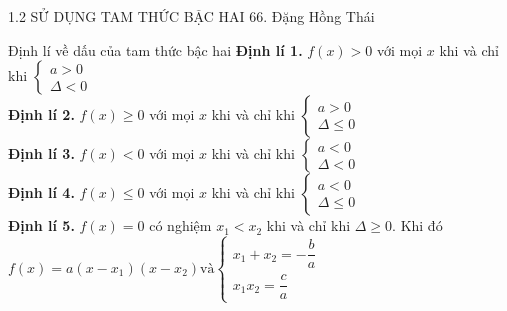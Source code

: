\begin{frame}{1.2 SỬ DỤNG TAM THỨC BẬC HAI \hspace{3cm}  66. Đặng Hồng Thái} 
    \begin{block}{Định lí về dấu của tam thức bậc hai}
        \textbf{Định lí 1.}  $f(x)>0$ với mọi $x$ khi và chỉ khi 
                $\begin{cases}
		 	a>0 \\
		 	\Delta <0
		 	\end{cases}$    \\
         \textbf{Định lí 2.}  $f(x)\geq0$ với mọi $x$ khi và chỉ khi 
                $\begin{cases}
		 	a>0 \\
		 	\Delta \leq0
		 	\end{cases}$    \\
         \textbf{Định lí 3.}  $f(x)<0$ với mọi $x$ khi và chỉ khi 
                $\begin{cases}
		 	a<0 \\
		 	\Delta <0
		 	\end{cases}$    \\
         \textbf{Định lí 4.}  $f(x)\leq0$ với mọi $x$ khi và chỉ khi 
                $\begin{cases}
		 	a<0 \\
		 	\Delta \leq0
		 	\end{cases}$ \\
         \textbf{Định lí 5.}  $f(x)=0$ có nghiệm $x_1<x_2$ khi và chỉ khi           $\Delta\geq 0$. Khi đó \\
                \hspace{2cm} $f(x) = a(x-x_1)(x-x_2) \text{và} \begin{cases}
		 	x_1+x_2=-\dfrac{b}{a} \\
		 	x_1x_2=\dfrac{c}{a}
		 	\end{cases}$
    \end{block} 
\end{frame}


